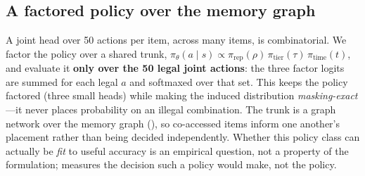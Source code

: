 \subsection{A factored policy over the memory graph}
A joint head over 50 actions per item, across many items, is combinatorial. We factor the policy over a
shared trunk, $\pi_\theta(a\mid s)\propto \pi_{\text{rep}}(\rho)\,\pi_{\text{tier}}(\tau)\,
\pi_{\text{time}}(t)$, and evaluate it \textbf{only over the 50 legal joint actions}: the three factor
logits are summed for each legal $a$ and softmaxed over that set. This keeps the policy factored (three
small heads) while making the induced distribution \emph{masking-exact}---it never places probability on
an illegal combination. The trunk is a graph network over the memory graph
(), so co-accessed items inform one another's placement rather than being decided
independently. Whether this policy class can actually be \emph{fit} to useful accuracy is an empirical
question, not a property of the formulation;  measures the decision such a policy
would make, not the policy.
